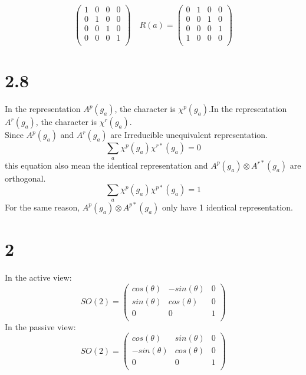 \documentclass{article}
\begin{document}
\begin{CJK*}{GBK}{song}
\begin{equation}
\begin{pmatrix}
     1  &  0  &  0  &  0\\
     0  &  1  &  0  &  0\\
     0  &  0  &  1  &  0\\
     0  &  0  &  0  &  1\\
\end{pmatrix}\quad
R(a)=
\begin{pmatrix}
     0  &  1  &  0  &  0\\
     0  &  0  &  1  &  0\\
     0  &  0  &  0  &  1\\
     1  &  0  &  0  &  0\\
\end{pmatrix}
\end{equation}





\section{2.8}
In the representation $A^p(g_a)$, the character is $\chi^p(g_a)$.In the representation $A^r(g_a)$, the character is $\chi^r(g_a)$.\\
Since $A^p(g_a)$ and  $A^r(g_a)$ are Irreducible unequivalent representation.
\begin{equation}
\sum_a\chi^p(g_a)\chi^{r*}(g_a)=0
\end{equation}
this equation also mean the identical representation and $A^p(g_a)\otimes A^{r*}(g_a)$ are orthogonal.
\begin{equation}
\sum_a\chi^p(g_a)\chi^{p*}(g_a)=1
\end{equation}
For the same reason, $A^p(g_a)\otimes A^{p*}(g_a)$ only have 1 identical representation.

\section{2}
In the active view:
\begin{equation}
SO(2)=
\begin{pmatrix}
     cos(\theta)  &  -sin(\theta)  &  0  \\
      sin(\theta)  &  cos(\theta)  &  0  \\
                    0  &                 0  &  1  \\
\end{pmatrix}
\end{equation}
In the passive view:
\begin{equation}
SO(2)=
\begin{pmatrix}
     cos(\theta)  &   sin(\theta)  &  0  \\
     -sin(\theta)  &  cos(\theta)  &  0  \\
                    0  &                 0  &  1  \\
\end{pmatrix}
\end{equation}



\end{CJK*}
\end{document}
